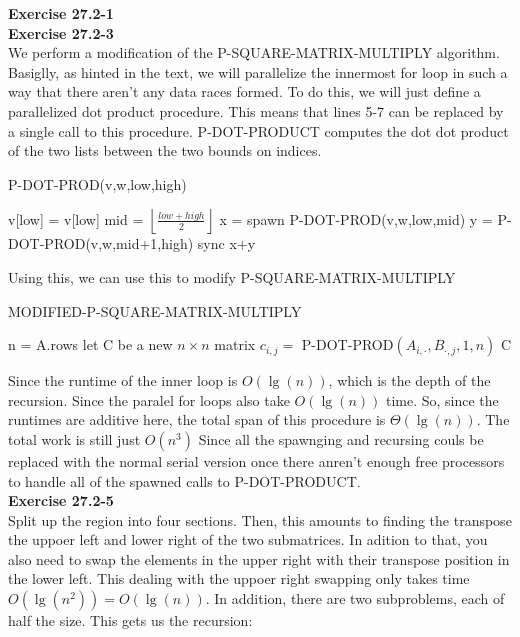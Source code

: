 \documentclass{article}
\begin{document}
\noindent\textbf{Exercise 27.2-1}\\



\noindent\textbf{Exercise 27.2-3}\\
We perform a modification of the P-SQUARE-MATRIX-MULTIPLY algorithm. Basiglly, as hinted in the text, we will parallelize the innermost for loop in such a way that there aren't any data races formed. To do this, we will just define a parallelized dot product procedure. This means that lines 5-7 can be replaced by a single call to this procedure. P-DOT-PRODUCT computes the dot dot product of the two lists between the two bounds on indices.

\begin{algorithm}
\caption{P-DOT-PROD(v,w,low,high)}
\begin{algorithmic}
\State \Return  v[low] = v[low]
\EndIf
\State mid = $\left\lfloor \frac{low+high}{2}\right\rfloor$
\State x = spawn P-DOT-PROD(v,w,low,mid)
\State y = P-DOT-PROD(v,w,mid+1,high)
\State sync
\State \Return x+y
\end{algorithmic}
\end{algorithm}

Using this, we can use this to modify P-SQUARE-MATRIX-MULTIPLY

\begin{algorithm}
\caption{MODIFIED-P-SQUARE-MATRIX-MULTIPLY}
\begin{algorithmic}
\State n = A.rows
\State let C be a new $n\times n$ matrix
\State $c_{i,j} =$ P-DOT-PROD$(A_{i,\cdot},B_{\cdot,j},1,n)$
\EndParFor
\EndParFor
\State \Return C
\end{algorithmic}
\end{algorithm}

Since the runtime of the inner loop is $O(\lg(n))$, which is the depth of the recursion. Since the paralel for loops also take $O(\lg(n))$ time. So, since the runtimes are additive here, the total span of this procedure is $\Theta(\lg(n))$. The total work is still just $O(n^3)$ Since all the spawnging and recursing couls be replaced with the normal serial version once there anren't enough free processors to handle all of the spawned calls to P-DOT-PRODUCT. \\



\noindent\textbf{Exercise 27.2-5}\\
Split up the region into four sections. Then, this amounts to finding the transpose the uppoer left and lower right of the two submatrices. In adition to that, you also need to swap the elements in the upper right with their transpose position in the lower left. This dealing with the uppoer right swapping only takes time $O(\lg(n^2)) = O(\lg(n))$. In addition, there are two subproblems, each of half the size. This gets us the recursion:
\end{document}
